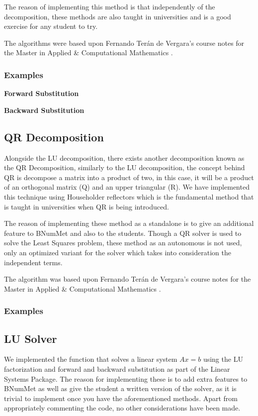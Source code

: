 The reason of implementing this method is that independently of the decomposition, these methods are also taught in universities and is a good exercise for any student to try.

The algorithms were based upon Fernando Terán de Vergara's course notes for the Master in Applied \& Computational Mathematics \cite{Vergara}.
\subsubsection{Examples}
\textbf{Forward Substitution}
	
 \textbf{Backward Substitution}
	
\subsection{QR Decomposition}
Alongside the LU decomposition, there exists another decomposition known as the QR Decomposition, similarly to the LU decomposition, the concept behind QR is decompose a matrix into a product of two, in this case, it will be a product of an orthogonal matrix (Q) and an upper triangular (R). We have implemented this technique using Householder reflectors which is the fundamental method that is taught in universities when QR is being introduced.

The reason of implementing these method as a standalone is to give an additional feature to BNumMet and also to the students. Though a QR solver is used to solve the Least Squares problem, these method as an autonomous is not used, only an optimized variant for the solver which takes into consideration the independent terms.

The algorithm was based upon Fernando Terán de Vergara's course notes for the Master in Applied \& Computational Mathematics \cite{Vergara}.
\subsubsection{Examples}


\subsection{LU Solver}
We implemented the function that solves a linear system $Ax=b$ using the LU factorization and forward and backward substitution as part of the Linear Systems Package. The reason for implementing these is to add extra features to BNumMet as well as give the student a written version of the solver, as it is trivial to implement once you have the aforementioned methods. Apart from appropriately commenting the code, no other considerations have been made.

